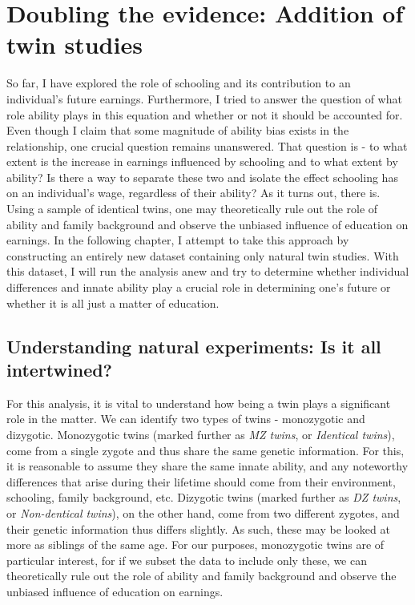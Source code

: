 \chapter{Doubling the evidence: Addition of twin studies}
\label{chap:seven}

So far, I have explored the role of schooling and its contribution to an individual's future earnings. Furthermore, I tried to answer the question of what role ability plays in this equation and whether or not it should be accounted for.
Even though I claim that some magnitude of ability bias exists in the relationship, one crucial question remains unanswered. That question is - to what extent is the increase in earnings influenced by schooling and to what extent by ability? Is there a way to separate these two and isolate the effect schooling has on an individual's wage, regardless of their ability? As it turns out, there is. Using a sample of identical twins, one may theoretically rule out the role of ability and family background and observe the unbiased influence of education on earnings. In the following chapter, I attempt to take this approach by constructing an entirely new dataset containing only natural twin studies. With this dataset, I will run the analysis anew and try to determine whether individual differences and innate ability play a crucial role in determining one's future or whether it is all just a matter of education.


\section{Understanding natural experiments: Is it all intertwined?}
\label{sec:twins_literature}

For this analysis, it is vital to understand how being a twin plays a significant role in the matter. We can identify two types of twins - monozygotic and dizygotic. Monozygotic twins (marked further as \textit{MZ twins}, or \textit{Identical twins}), come from a single zygote and thus share the same genetic information. For this, it is reasonable to assume they share the same innate ability, and any noteworthy differences that arise during their lifetime should come from their environment, schooling, family background, etc. Dizygotic twins (marked further as \textit{DZ twins}, or \textit{Non-dentical twins}), on the other hand, come from two different zygotes, and their genetic information thus differs slightly. As such, these may be looked at more as siblings of the same age. For our purposes, monozygotic twins are of particular interest, for if we subset the data to include only these, we can theoretically rule out the role of ability and family background and observe the unbiased influence of education on earnings.

